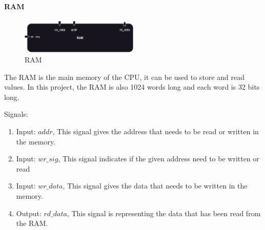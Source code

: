 \paragraph{RAM}

\begin{figure}[H]
    \centering
    \includegraphics[width=0.5\textwidth]{design/pipelined/rom_ram_reg/images/ram.png}
    \caption{RAM}
    \label{fig:ram}
\end{figure}

The RAM is the main memory of the CPU, it can be used to store and read values. In this project, the RAM is also 1024 words long
and each word is 32 bits long.

Signals:
\begin{enumerate}[label={\textbullet}]
    \item Input: $addr$, This signal gives the address that needs to be read or written in the memory.
    \item Input: $wr\_sig$, This signal indicates if the given address need to be written or read
    \item Input: $wr\_data$, This signal gives the data that needs to be written in the memory.
    \item Output: $rd\_data$, This signal is representing the data that has been read from the RAM.
\end{enumerate}